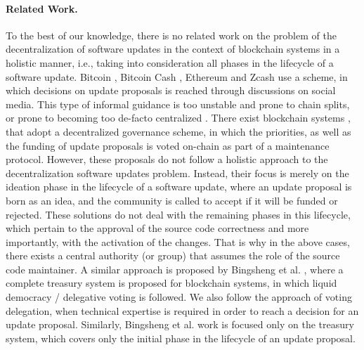 \paragraph{Related Work.}
To the best of our knowledge, there is no related work on the problem of the
decentralization of software updates in the context of blockchain systems in a
holistic manner, i.e., taking into consideration all phases in the lifecycle of
a software update.
Bitcoin \cite{bitcoin}, Bitcoin Cash \cite{bitcoincash}, Ethereum
\cite{ethereum} and Zcash \cite{zerocash} use a  scheme,
in which decisions on update proposals is reached through discussions on social
media. This type of informal guidance is  too unstable and prone to chain
splits, or prone to becoming too de-facto centralized \cite{buterin_on_gov}.
There exist blockchain systems \cite{dash}, \cite{decred} that adopt a
decentralized governance scheme, in which the priorities, as well as the
funding of update proposals is voted on-chain as part of a maintenance
protocol. However, these proposals do not follow a holistic approach to the
decentralization software updates problem. Instead, their focus is merely on
the ideation phase in the lifecycle of a software update, where an update
proposal is born as an idea, and the community is called to accept if it will
be funded or rejected. These solutions do not deal with the remaining phases in
this lifecycle, which pertain to the approval of the source code correctness
and more importantly, with the activation of the changes. That is why in the
above cases, there exists a central authority (or group) that assumes the role
of the source code maintainer. A similar approach is proposed by Bingsheng et
al. \cite{treasury}, where a complete treasury system is proposed for
blockchain systems, in which liquid democracy / delegative voting is followed.
We also follow the approach of voting delegation, when technical expertise is
required in order to reach a decision for an update proposal. Similarly,
Bingsheng et al. work is focused only on the treasury system, which covers only
the initial phase in the lifecycle of an update proposal.


%
